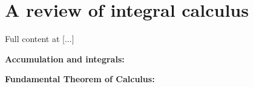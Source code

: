 \chapter{A review of integral calculus}
\label{appendix3}

Full content at [...]

\medskip

\textbf{Accumulation and integrals:}

\medskip

\textbf{Fundamental Theorem of Calculus:}
